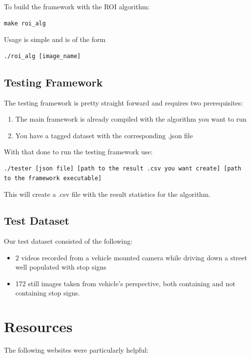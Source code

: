 \documentclass[letterpaper,10pt,titlepage]{article}
\begin{document}
To build the framework with the ROI algorithm:
\begin{lstlisting}
make roi_alg
\end{lstlisting}

Usage is simple and is of the form
\begin{lstlisting}
./roi_alg [image_name]
\end{lstlisting}

\subsection*{Testing Framework}

The testing framework is pretty straight forward and requires two prerequisites:
\begin{enumerate}
    \item The main framework is already compiled with the algorithm you want to run
    \item You have a tagged dataset with the corresponding .json file 
\end{enumerate}
With that done to run the testing framework use:
\begin{lstlisting}
./tester [json file] [path to the result .csv you want create] [path to the framework executable]
\end{lstlisting}
This will create a .csv file with the result statistics for the algorithm.

\subsection*{Test Dataset}
Our test dataset consisted of the following:
\begin{itemize}
    \item 2 videos recorded from a vehicle mounted camera while driving down a street well populated with stop signs
    \item 172 still images taken from vehicle's perspective, both containing and not containing stop signs.
\end{itemize}

\section*{Resources}
The following websites were particularly helpful:
\end{document}
